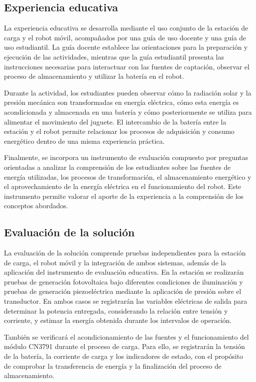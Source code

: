 \documentclass[11pt]{article}
\begin{document}
\subsection{Experiencia educativa}

La experiencia educativa se desarrolla mediante el uso conjunto de la estación de carga y el robot móvil, acompañados por una guía de uso docente y una guía de uso estudiantil. La guía docente establece las orientaciones para la preparación y ejecución de las actividades, mientras que la guía estudiantil presenta las instrucciones necesarias para interactuar con las fuentes de captación, observar el proceso de almacenamiento y utilizar la batería en el robot.

Durante la actividad, los estudiantes pueden observar cómo la radiación solar y la presión mecánica son transformadas en energía eléctrica, cómo esta energía es acondicionada y almacenada en una batería y cómo posteriormente se utiliza para alimentar el movimiento del juguete. El intercambio de la batería entre la estación y el robot permite relacionar los procesos de adquisición y consumo energético dentro de una misma experiencia práctica.

Finalmente, se incorpora un instrumento de evaluación compuesto por preguntas orientadas a analizar la comprensión de los estudiantes sobre las fuentes de energía utilizadas, los procesos de transformación, el almacenamiento energético y el aprovechamiento de la energía eléctrica en el funcionamiento del robot. Este instrumento permite valorar el aporte de la experiencia a la comprensión de los conceptos abordados.

\subsection{Evaluación de la solución}

La evaluación de la solución comprende pruebas independientes para la estación de carga, el robot móvil y la integración de ambos sistemas, además de la aplicación del instrumento de evaluación educativa. En la estación se realizarán pruebas de generación fotovoltaica bajo diferentes condiciones de iluminación y pruebas de generación piezoeléctrica mediante la aplicación de presión sobre el transductor. En ambos casos se registrarán las variables eléctricas de salida para determinar la potencia entregada, considerando la relación entre tensión y corriente, y estimar la energía obtenida durante los intervalos de operación.

También se verificará el acondicionamiento de las fuentes y el funcionamiento del módulo CN3791 durante el proceso de carga. Para ello, se registrarán la tensión de la batería, la corriente de carga y los indicadores de estado, con el propósito de comprobar la transferencia de energía y la finalización del proceso de almacenamiento.
\end{document}
